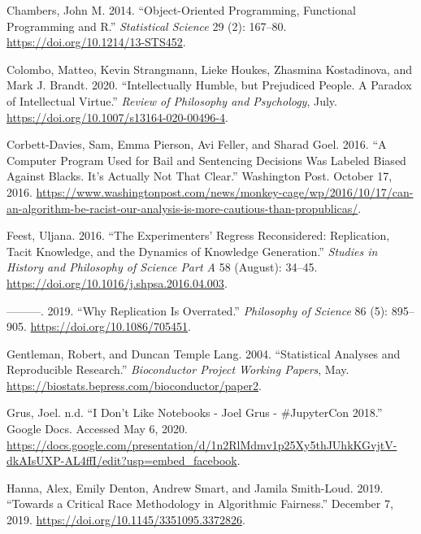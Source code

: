 \documentclass[
]{article}
\newlength{\cslhangindent}
\newenvironment{cslreferences}%
  {\setlength{\parindent}{0pt}%
  \everypar{\setlength{\hangindent}{\cslhangindent}}\ignorespaces}%
  {\par}
\begin{document}
\begin{cslreferences}
\leavevmode\hypertarget{ref-ChambersObjectOrientedProgrammingFunctional2014}{}%
Chambers, John M. 2014. ``Object-Oriented Programming, Functional Programming and R.'' \emph{Statistical Science} 29 (2): 167--80. \url{https://doi.org/10.1214/13-STS452}.

\leavevmode\hypertarget{ref-ColomboIntellectuallyHumblePrejudiced2020}{}%
Colombo, Matteo, Kevin Strangmann, Lieke Houkes, Zhasmina Kostadinova, and Mark J. Brandt. 2020. ``Intellectually Humble, but Prejudiced People. A Paradox of Intellectual Virtue.'' \emph{Review of Philosophy and Psychology}, July. \url{https://doi.org/10.1007/s13164-020-00496-4}.

\leavevmode\hypertarget{ref-Corbett-DaviesComputerProgramUsed2016}{}%
Corbett-Davies, Sam, Emma Pierson, Avi Feller, and Sharad Goel. 2016. ``A Computer Program Used for Bail and Sentencing Decisions Was Labeled Biased Against Blacks. It's Actually Not That Clear.'' Washington Post. October 17, 2016. \url{https://www.washingtonpost.com/news/monkey-cage/wp/2016/10/17/can-an-algorithm-be-racist-our-analysis-is-more-cautious-than-propublicas/}.

\leavevmode\hypertarget{ref-FeestExperimentersRegressReconsidered2016}{}%
Feest, Uljana. 2016. ``The Experimenters' Regress Reconsidered: Replication, Tacit Knowledge, and the Dynamics of Knowledge Generation.'' \emph{Studies in History and Philosophy of Science Part A} 58 (August): 34--45. \url{https://doi.org/10.1016/j.shpsa.2016.04.003}.

\leavevmode\hypertarget{ref-FeestWhyReplicationOverrated2019}{}%
---------. 2019. ``Why Replication Is Overrated.'' \emph{Philosophy of Science} 86 (5): 895--905. \url{https://doi.org/10.1086/705451}.

\leavevmode\hypertarget{ref-GentlemanStatisticalAnalysesReproducible2004}{}%
Gentleman, Robert, and Duncan Temple Lang. 2004. ``Statistical Analyses and Reproducible Research.'' \emph{Bioconductor Project Working Papers}, May. \url{https://biostats.bepress.com/bioconductor/paper2}.

\leavevmode\hypertarget{ref-GrusDonNotebooksJoel}{}%
Grus, Joel. n.d. ``I Don't Like Notebooks - Joel Grus - \#JupyterCon 2018.'' Google Docs. Accessed May 6, 2020. \url{https://docs.google.com/presentation/d/1n2RlMdmv1p25Xy5thJUhkKGvjtV-dkAIsUXP-AL4ffI/edit?usp=embed_facebook}.

\leavevmode\hypertarget{ref-HannaCriticalRaceMethodology2019}{}%
Hanna, Alex, Emily Denton, Andrew Smart, and Jamila Smith-Loud. 2019. ``Towards a Critical Race Methodology in Algorithmic Fairness.'' December 7, 2019. \url{https://doi.org/10.1145/3351095.3372826}.


\end{cslreferences}
\end{document}
